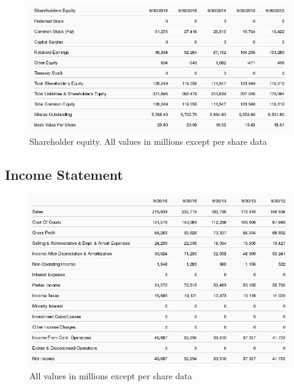 \documentclass[12pt,a4paper,titlepage]{article}
\begin{document}

\begin{figure}[!htb]
  \centering
  \includegraphics[width=1\textwidth]{shareholder}
    \caption{Shareholder equity. All values in millions except per share
      data~\cite{zacks-bal}}
\end{figure}

\newpage                        %

\subsection{Income Statement}
\begin{figure}[!htb]
  \centering
  \includegraphics[width=1\textwidth]{income}
    \caption{All values in millions except per share data~\cite{zacks-income}}
\end{figure}

\newpage
\end{document}
